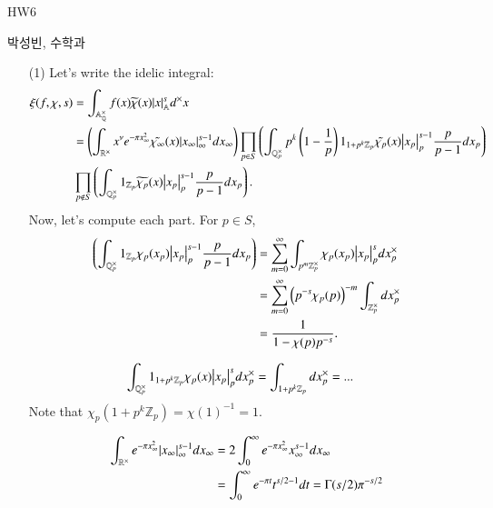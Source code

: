 \documentclass[a4paper, 12pt]{article}
\theoremstyle{Mydefinition}
\theoremstyle{Mytheorem}
\begin{document}
\thispagestyle{myfirstpage}
\begin{center}
	\Large{HW6}
\end{center}
박성빈, 수학과

\begin{enumerate}
    \item[(1)] Let's write the idelic integral:
    \begin{equation}
    \begin{split}
        \xi(f,\chi, s) &= \int_{\mathbb{A}_\mathbb{Q}^\times} f(x)\widetilde{\chi}(x)\abs{x}_{\mathbb{A}}^s d^\times x\\
        &=\left(\int_{\mathbb{R}^\times} x^\nu e^{-\pi x_\infty^2}\tilde{\chi_\infty}(x)\abs{x_\infty}_{\infty}^{s-1} dx_\infty\right)\prod_{p\in S}\left(\int_{\mathbb{Q}_p^\times} p^k\left(1-\frac{1}{p}\right)1_{1+p^k \mathbb{Z}_p}\tilde{\chi_p}(x)\abs{x_p}_{p}^{s-1} \frac{p}{p-1}dx_p\right)\\
        &\prod_{p\not\in S}\left(\int_{\mathbb{Q}_p^\times} 1_{\mathbb{Z}_p}\widetilde{\chi_p}(x)\abs{x_p}_{p}^{s-1} \frac{p}{p-1}dx_p\right).
    \end{split}
    \end{equation}
    Now, let's compute each part. For $p\in S$,
    \begin{equation}
        \begin{split}
        \left(\int_{\mathbb{Q}_p^\times} 1_{\mathbb{Z}_p}\chi_p(x_p)\abs{x_p}_{p}^{s-1} \frac{p}{p-1}dx_p\right) &=\sum_{m=0}^\infty\int_{p^m\mathbb{Z}^\times_p} \chi_p(x_p)\abs{x_p}_{p}^{s} dx^\times_p\\
        &=\sum_{m=0}^\infty \left(p^{-s}\chi_p(p)\right)^{-m}\int_{\mathbb{Z}^\times_p} dx^\times_p\\
        &=\frac{1}{1-\chi(p)p^{-s}}.
        \end{split}
    \end{equation}
    
    \begin{equation}
    \begin{split}
        \int_{\mathbb{Q}_p^\times} 1_{1+p^k \mathbb{Z}_p}\chi_p(x)\abs{x_p}_{p}^{s} dx^\times_p &=\int_{1+p^k \mathbb{Z}_p} dx^\times_p = ...
    \end{split}
    \end{equation}
    Note that $\chi_p(1+p^k\mathbb{Z}_p) = \chi(1)^{-1} = 1$.
    
    \begin{equation}
    \begin{split}
        \int_{\mathbb{R}^\times} e^{-\pi x_\infty^2}\abs{x_\infty}_{\infty}^{s-1} dx_\infty &= 2\int_0^\infty e^{-\pi x_\infty^2} x_\infty^{s-1}dx_\infty\\
        &=\int_0^\infty e^{-\pi t} t^{s/2-1}dt = \Gamma(s/2)\pi^{-s/2}
    \end{split}
    \end{equation}
    

\end{enumerate}
\end{document}
